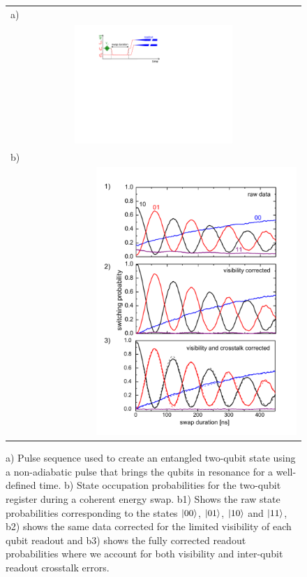 \begin{figure}[p]
	\begin{tabular}{l}
	a) \\ \multicolumn{1}{c}{\hspace{0.6cm}\includegraphics[width=0.55\textwidth]{"./material/figures/measurement/qubit_swap"}} \\
	b) \\ \multicolumn{1}{r}{\includegraphics[width=0.7\textwidth]{"./material/papers/iswap/figures/swap_raw_and_corrected"}}
	\end{tabular}
	\caption[]{a) Pulse sequence used to create an entangled two-qubit state using a non-adiabatic pulse that brings the qubits in resonance for a well-defined time. b) State occupation probabilities for the two-qubit register during a coherent energy swap. b1) Shows the raw state probabilities corresponding to the states $\left| 00 \right>$, $\left| 01 \right>$, $\left| 10 \right>$ and $\left| 11 \right>$, b2) shows the same data corrected for the limited visibility of each qubit readout and b3) shows the fully corrected readout probabilities where we account for both visibility and inter-qubit readout crosstalk errors.}
	\label{fig:swap_raw_and_corrected}
	\label{fig:qubit_swap_pulse_sequence}
\end{figure}


